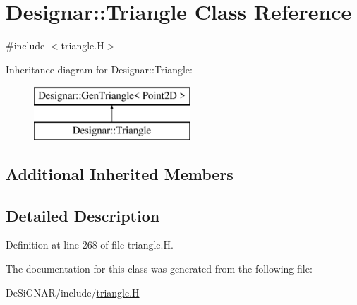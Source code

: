\hypertarget{class_designar_1_1_triangle}{}\section{Designar\+:\+:Triangle Class Reference}
\label{class_designar_1_1_triangle}


{\ttfamily \#include $<$triangle.\+H$>$}

Inheritance diagram for Designar\+:\+:Triangle\+:\begin{figure}[H]
\begin{center}
\leavevmode
\includegraphics[height=2.000000cm]{class_designar_1_1_triangle}
\end{center}
\end{figure}
\subsection*{Additional Inherited Members}


\subsection{Detailed Description}


Definition at line 268 of file triangle.\+H.



The documentation for this class was generated from the following file\+:\begin{DoxyCompactItemize}
\item 
De\+Si\+G\+N\+A\+R/include/\hyperlink{triangle_8_h}{triangle.\+H}\end{DoxyCompactItemize}
